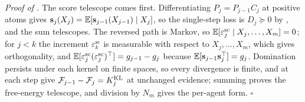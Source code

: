 \noindent\emph{Proof of .}
The score telescope comes first. Differentiating $P_j=P_{j-1}C_j$ at positive atoms gives
$\mathbf s_j(X_j)=\mathbb E[\mathbf s_{j-1}(X_{j-1})\mid X_j]$, so the single-step loss is $D_j\succeq0$
by , and the sum telescopes. The reversed path is Markov, so
$\mathbb E[\varepsilon^{\mathrm{sc}}_j\mid X_j,\ldots,X_m]=0$; for $j<k$ the increment
$\varepsilon^{\mathrm{sc}}_k$ is measurable with respect to $X_j,\ldots,X_m$, which gives
orthogonality, and $\mathbb E[\varepsilon^{\mathrm{sc}}_j(\varepsilon^{\mathrm{sc}}_j)^\top]
=g_{j-1}-g_j$ because $\mathbb E[\mathbf s_{j-1}\mathbf s_j^\top]=g_j$. Domination persists under each
kernel on finite spaces, so every divergence is finite, and
 at each step give
$\mathcal F_{j-1}-\mathcal F_j=K^{\mathrm{KL}}_j$ at unchanged evidence; summing proves the free-energy
telescope, and division by $N_m$ gives the per-agent form.
$\square$

